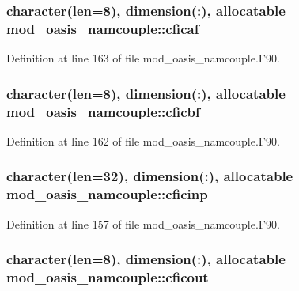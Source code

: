 \hypertarget{classmod__oasis__namcouple_a9b3c7c879a3ff2b5eb15cbcaf5a8a1d9}{
\subsubsection[{cficaf}]{\setlength{\rightskip}{0pt plus 5cm}character(len=8), dimension(\+:), allocatable mod\+\_\+oasis\+\_\+namcouple\+::cficaf\hspace{0.3cm}{\ttfamily [private]}}}\label{classmod__oasis__namcouple_a9b3c7c879a3ff2b5eb15cbcaf5a8a1d9}


Definition at line 163 of file mod\+\_\+oasis\+\_\+namcouple.\+F90.

\hypertarget{classmod__oasis__namcouple_a9e90e47fd11ff4dd95c61dcf3ec872ff}{
\subsubsection[{cficbf}]{\setlength{\rightskip}{0pt plus 5cm}character(len=8), dimension(\+:), allocatable mod\+\_\+oasis\+\_\+namcouple\+::cficbf\hspace{0.3cm}{\ttfamily [private]}}}\label{classmod__oasis__namcouple_a9e90e47fd11ff4dd95c61dcf3ec872ff}


Definition at line 162 of file mod\+\_\+oasis\+\_\+namcouple.\+F90.

\hypertarget{classmod__oasis__namcouple_af17e746f51dcf0110428ebe55f6d7285}{
\subsubsection[{cficinp}]{\setlength{\rightskip}{0pt plus 5cm}character(len=32), dimension(\+:), allocatable mod\+\_\+oasis\+\_\+namcouple\+::cficinp\hspace{0.3cm}{\ttfamily [private]}}}\label{classmod__oasis__namcouple_af17e746f51dcf0110428ebe55f6d7285}


Definition at line 157 of file mod\+\_\+oasis\+\_\+namcouple.\+F90.

\hypertarget{classmod__oasis__namcouple_a62f96a372f013fc37713f8ba1728e3de}{
\subsubsection[{cficout}]{\setlength{\rightskip}{0pt plus 5cm}character(len=8), dimension(\+:), allocatable mod\+\_\+oasis\+\_\+namcouple\+::cficout\hspace{0.3cm}{\ttfamily [private]}}}\label{classmod__oasis__namcouple_a62f96a372f013fc37713f8ba1728e3de}


